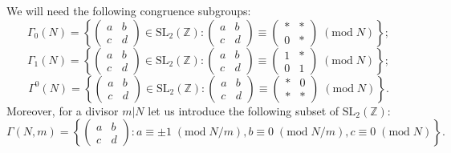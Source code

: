 \documentclass{article}
\theoremstyle{definition}
\newcommand{\ZZ} {{\mathbb Z}}		%
\begin{document}
We will need the following congruence subgroups:
\[  \Gamma_0(N) = \left\{ \begin{pmatrix} a & b \\ c & d \end{pmatrix} \in 
\mathrm{SL_2}( \ZZ) : \begin{pmatrix} a & b \\ c & d \end{pmatrix} \equiv 
\begin{pmatrix} \ast & \ast \\ 0 & \ast \end{pmatrix} \;(\mathrm{mod}\;N) \right\}; \]
\[  \Gamma_1(N) = \left\{ \begin{pmatrix} a & b \\ c & d \end{pmatrix} \in 
\mathrm{SL_2}( \ZZ) : \begin{pmatrix} a & b \\ c & d \end{pmatrix} \equiv 
\begin{pmatrix} 1 & \ast \\ 0 & 1 \end{pmatrix} \;(\mathrm{mod}\;N) \right\}; \]
\[  \Gamma^0(N) = \left\{ \begin{pmatrix} a & b \\ c & d \end{pmatrix} \in 
\mathrm{SL_2}( \ZZ) : \begin{pmatrix} a & b \\ c & d \end{pmatrix} \equiv 
\begin{pmatrix} \ast & 0 \\ \ast & \ast \end{pmatrix} \;(\mathrm{mod}\;N) \right\}. \]
Moreover, for a divisor $m|N$ let us introduce the following subset of $\mathrm{SL_2}( \ZZ)$:
\[  \Gamma(N,m) = \left\{ \begin{pmatrix} a & b \\ c & d \end{pmatrix}: 
a \equiv \pm 1 \;(\mathrm{mod}\;N/m), b \equiv 0 \;(\mathrm{mod}\;N/m), 
c \equiv 0 \;(\mathrm{mod}\;N) \right\}. \]
\end{document}
